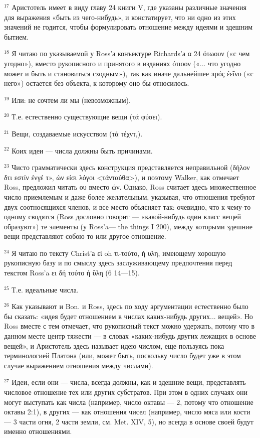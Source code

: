 \documentclass[oneside, 17pt, dvipsnames]{extbook}
\begin{document}
$^{17}$ Аристотель имеет в виду главу 24 книги V, где указаны различные значения для выражения «быть из чего-нибудь», и констатирует, что ни одно из этих значений не годится, чтобы формулировать отношение между идеями и здешним бытием.

$^{18}$ Я читаю по указываемой у Ross'а конъектуре Richards'а α 24 ότωουν («с чем угодно»), вместо рукописного и принятого в изданиях ότιοον («... что угодно может и быть и становиться сходным»), так как иначе дальнейшее πρός έεΐνο («с него») остается без объекта, к которому оно бы относилось.

$^{19}$ Или: не сочтем ли мы (невозможным).

$^{20}$ Т.е. естественно существующие вещи (τά φύσει).

$^{21}$ Вещи, создаваемые искусством (τά τέχντ,).

$^{22}$ Коих идеи — числа должны быть причинами.

$^{23}$ Чисто грамматически здесь конструкция представляется неправильной (δήλον δτι εστίν ένγέ τ», ών είσι λόγοι <τάνταύθα>), и поэтому Walker, как отмечает Ross, предложил читать ου вместо ών. Однако, Ross считает здесь множественное число приемлемым и даже более желательным, указывая, что отношения требуют двух соотносящихся членов, и все место объясняет так: очевидно, что к чему-то одному сводятся (Ross дословно говорит — «какой-нибудь один класс вещей образуют») те элементы (у Ross'a— the things I 200), между которыми здешние вещи представляют собою то или другое отношение.

$^{24}$ Я читаю по тексту Christ'а εί oh τι-τούτο, ή υλη, имеющему хорошую рукописную базу и по смыслу здесь заслуживающему предпочтения перед текстом Ross'a ει δή τούτο ή ΰλη (6 14—15).

$^{25}$ Т.е. идеальные числа.

$^{26}$ Как указывают и Bon. и Ross, здесь по ходу аргументации естественно было бы сказать: «идея будет отношением в числах каких-нибудь других... вещей». Но Ross вместе с тем отмечает, что рукописный текст можно удержать, потому что в данном месте центр тяжести — в словах «каких-нибудь других лежащих в основе вещей», и Аристотель здесь называет идею числом, еще пользуясь пока терминологией Платона (или, может быть, поскольку число будет уже в этом случае выражением отношения между числами).

$^{27}$ Идеи, если они — числа, всегда должны, как и здешние вещи, представлять числовое отношение тех или других субстратов. При этом в одних случаях они могут выступать как числа (например, число октавы — 2, потому что отношение октавы 2:1), в других — как отношения чисел (например, число мяса или кости — 3 части огня, 2 части земли, см. Met. XIV, 5), но всегда в основе своей будут именно отношениями.
\end{document}
